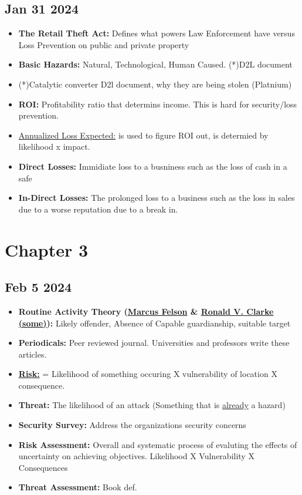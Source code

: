 \documentclass[12pt]{article}
\begin{document}
\subsection*{Jan 31 2024}

\begin{itemize}
		  \item \textbf{The Retail Theft Act:} Defines what powers Law Enforcement have versus Loss Prevention on public
					 and private property
		  \item \textbf{Basic Hazards:} Natural, Technological, Human Caused. (*)D2L document
		  \item (*)Catalytic converter D2l document, why they are being stolen (Platnium)
		  \item \textbf{ROI:} Profitability ratio that determins income. This is hard for security/loss prevention. 
		  \item \underline{Annualized Loss Expected:} is used to figure ROI out, is determied by likelihood x impact. 
		  \item \textbf{Direct Losses:} Immidiate loss to a busniness such as the loss of cash in a safe
		  \item \textbf{In-Direct Losses:} The prolonged loss to a business such as the loss in sales due to a 
					 worse reputation due to a break in. 
\end{itemize}

\section*{Chapter 3}

\subsection*{Feb 5 2024}

\begin{itemize}
		  \item \textbf{Routine Activity Theory (\underline{Marcus Felson} \& \underline{Ronald V. Clarke (some)}):} 
					 Likely offender, Absence of Capable guardianship, suitable target
		  \item \textbf{Periodicals:} Peer reviewed journal. Universities and professors write these articles.
		  \item \textbf{\underline{Risk:}} = Likelihood of something occuring X vulnerability of location X 
					 consequence.
		  \item \textbf{Threat:} The likelihood of an attack (Something that is \underline{already} a hazard)
		  \item \textbf{Security Survey:} Address the organizations security concerns
		  \item \textbf{Risk Assessment:} Overall and systematic process of evaluting the effects of uncertainty
					 on achieving objectives. Likelihood X Vulnerability X Consequences
		  \item \textbf{Threat Assessment:} Book def. 
\end{itemize}
\end{document}

